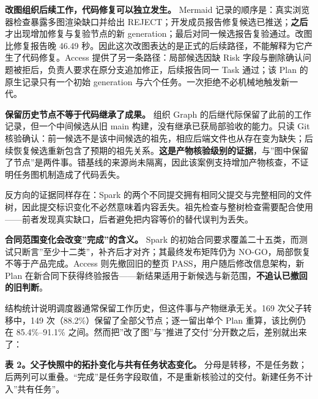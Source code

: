 \documentclass[
]{article}
\begin{document}
\textbf{改图组织后续工作，代码修复可以独立发生。} Mermaid
记录的顺序是：真实浏览器检查暴露多图渲染缺口并给出
REJECT；开发成员报告修复候选已推送；\textbf{之后}才出现增加修复与复验节点的新
generation；最后对同一候选报告复验通过。改图比修复报告晚 46.49
秒。因此这次改图表达的是正式的后续路径，不能解释为它产生了代码修复。Access
提供了另一条路径：局部候选因缺 Risk
字段与删除确认问题被拒后，负责人要求在原分支追加修正，后续报告同一 Task
通过；该 Plan 的原生记录只有一个初始 generation
与六个任务。一次拒绝不必机械地触发新一代。

\textbf{保留历史节点不等于代码继承了成果。} 组织 Graph
的后继代际保留了此前的工作记录，但一个中间候选从旧 main
构建，没有继承已获局部验收的能力。只读 Git
核验确认：前一候选不是该中间候选的祖先，相应后端文件也从存在变为缺失；后续恢复候选重新包含了预期的祖先关系。\textbf{这是产物核验级别的证据}，与''图中保留了节点''是两件事。错基线的来源尚未隔离，因此该案例支持增加产物核查，不证明任务图机制造成了代码丢失。

反方向的证据同样存在：Spark
的两个不同提交拥有相同父提交与完整相同的文件树，因此提交标识变化不必然意味着内容丢失。祖先检查与整树检查需要配合使用------前者发现真实缺口，后者避免把内容等价的替代误判为丢失。

\textbf{合同范围变化会改变''完成''的含义。} Spark
的初始合同要求覆盖二十五类，而测试只断言''至少十二类''，补齐后才对齐；其最终发布矩阵仍为
NO-GO，局部恢复不等于产品完成。Access 则先撤回旧的整页
PASS，用户随后修改信息架构，新 Plan
在新合同下获得终验报告------新结果适用于新候选与新范围，\textbf{不追认已撤回的旧判断}。

结构统计说明调度器通常保留工作历史，但这件事与产物继承无关。169
次父子转移中，149 次（88.2\%）保留了全部父节点；逐一留出单个 Plan
重算，该比例仍在 85.4\%--91.1\%
之间。然而把''改了图''与''推进了交付''分开数之后，差别就出来了：

\textbf{表 2。父子快照中的拓扑变化与共有任务状态变化。}
分母是转移，不是任务数；后两列可以重叠。``完成''是任务字段取值，不是重新核验过的交付。新建任务不计入''共有任务''。
\end{document}
